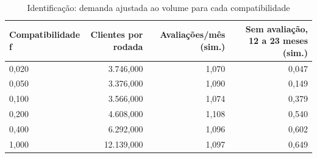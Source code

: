 \begin{table}[ht]
\centering
\caption{Identificação: demanda ajustada ao volume para cada compatibilidade}
\label{tab:identificacao}
\begin{tabular}{lrrr}
\hline
\textbf{Compatibilidade f} & \textbf{Clientes por rodada} & \textbf{Avaliações/mês (sim.)} & \textbf{Sem avaliação, 12 a 23 meses (sim.)} \\
\hline
0,020 & 3.746,000 & 1,070 & 0,047 \\
0,050 & 3.376,000 & 1,090 & 0,149 \\
0,100 & 3.566,000 & 1,074 & 0,379 \\
0,200 & 4.608,000 & 1,108 & 0,540 \\
0,400 & 6.292,000 & 1,096 & 0,602 \\
1,000 & 12.139,000 & 1,097 & 0,649 \\
\hline
\end{tabular}
\end{table}
